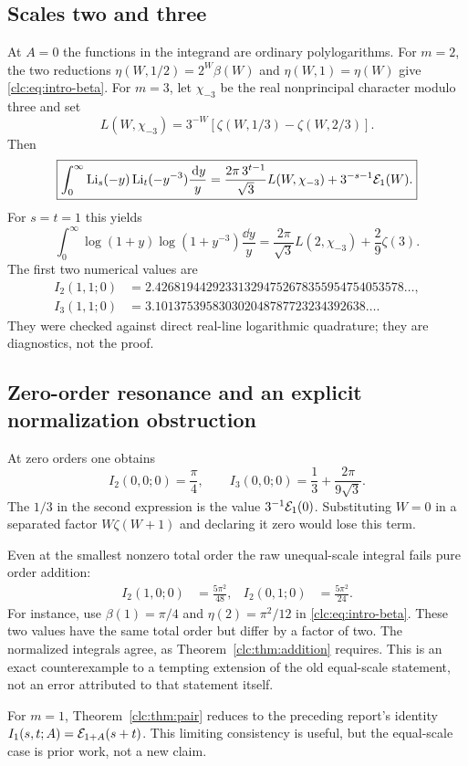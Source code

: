 \subsection{Scales two and three}
At $A=0$ the functions in the integrand are ordinary polylogarithms.
For $m=2$, the two reductions
$\eta(W,1/2)=2^W\beta(W)$ and $\eta(W,1)=\eta(W)$ give
\eqref{clc:eq:intro-beta}. For $m=3$, let $\chi_{-3}$ be the real
nonprincipal character modulo three and set
\[
 L(W,\chi_{-3})=3^{-W}
       [\zeta(W,1/3)-\zeta(W,2/3)].
\]
Then
\begin{equation}\label{clc:eq:pair3}
 \boxed{\displaystyle
 \int_0^\infty\operatorname{Li}_s(-y)\operatorname{Li}_t(-y^{-3})\frac{\,\mathrm d y}{y}
 =\frac{2\pi\,3^{t-1}}{\sqrt3}L(W,\chi_{-3})
    +3^{-s-1}\mathcal E_1(W).}
\end{equation}
For $s=t=1$ this yields
\begin{equation}\label{clc:eq:log3}
 \int_0^\infty\log(1+y)\log(1+y^{-3})\frac{\dd y}{y}
 =\frac{2\pi}{\sqrt3}L(2,\chi_{-3})+\frac29\zeta(3).
\end{equation}
The first two numerical values are
\begin{align*}
 I_2(1,1;0)&=2.426819442923313294752678355954754053578\ldots,\\
 I_3(1,1;0)&=3.101375395830302048787723234392638\ldots.
\end{align*}
They were checked against direct real-line logarithmic quadrature;
they are diagnostics, not the proof.

\subsection{Zero-order resonance and an explicit normalization obstruction}
At zero orders one obtains
\begin{equation}\label{clc:eq:zero-examples}
 I_2(0,0;0)=\frac\pi4,\qquad
 I_3(0,0;0)=\frac13+\frac{2\pi}{9\sqrt3}.
\end{equation}
The $1/3$ in the second expression is the value
$3^{-1}\mathcal E_1(0)$. Substituting $W=0$ in a separated factor
$W\zeta(W+1)$ and declaring it zero would lose this term.

Even at the smallest nonzero total order the raw unequal-scale
integral fails pure order addition:
\begin{align}
 I_2(1,0;0)&=\frac{5\pi^2}{48},&
 I_2(0,1;0)&=\frac{5\pi^2}{24}.
 \label{clc:eq:swap}
\end{align}
For instance, use $\beta(1)=\pi/4$ and $\eta(2)=\pi^2/12$ in
\eqref{clc:eq:intro-beta}. These two values have the same total order
but differ by a factor of two. The normalized integrals agree, as
Theorem~\ref{clc:thm:addition} requires. This is an exact counterexample
to a tempting extension of the old equal-scale statement, not an error
attributed to that statement itself.

For $m=1$, Theorem~\ref{clc:thm:pair} reduces to the preceding report's
identity $I_1(s,t;A)=\mathcal E_{1+A}(s+t)$. This limiting consistency is useful,
but the equal-scale case is prior work, not a new claim.
